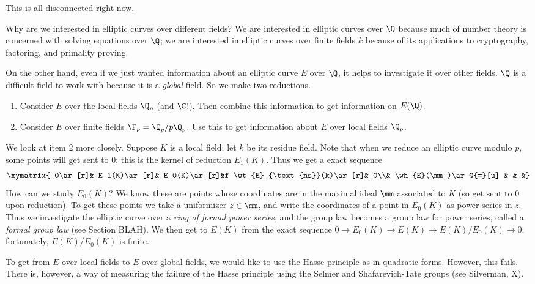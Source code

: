 This is all disconnected right now.

Why are we interested in elliptic curves over different fields? 
We are interested in elliptic curves over $\Q$ because much of number theory is concerned with solving equations over $\Q$; we are interested in elliptic curves over finite fields $k$ because of its applications to cryptography, factoring, and primality proving.

On the other hand, even if we just wanted information about an elliptic curve $E$ over $\Q$, it helps to investigate it over other fields. $\Q$ is a difficult field to work with because it is a {\it global} field. So we make two reductions.
\begin{enumerate}
\item Consider $E$ over the local fields $\Q_p$ (and $\C$!). Then combine this information to get information on $E(\Q)$.
\item Consider $E$ over finite fields $\F_p=\Q_p/p\Q_p$. Use this to get information about $E$ over local fields $\Q_p$.
\end{enumerate}
We look at item 2 more closely. Suppose $K$ is a local field; let $k$ be its residue field. 
Note that when we reduce an elliptic curve modulo $p$, some points will get sent to 0; this is the kernel of reduction $E_1(K)$. Thus we get a exact sequence
\[
\xymatrix{
0\ar[r]& E_1(K)\ar[r]&  E_0(K)\ar[r]&f  \wt{E}_{\text{ns}}(k)\ar[r]&  0\\%
& \wh{E}(\mm)\ar@{=}[u] &  & &}
\]
How can we study $E_0(K)$? We know these are points whose coordinates are in the maximal ideal $\mm$ associated to $K$ (so get sent to 0 upon reduction). 
To get these points we take a uniformizer $z\in \mm$, and write the coordinates of a point in $E_0(K)$ as power series in $z$. Thus we investigate the elliptic curve over a {\it ring of formal power series}, and the group law becomes a group law for power series, called a {\it formal group law} (see Section BLAH). We then get to $E(K)$ from the exact sequence $0\to E_0(K)\to E(K)\to E(K)/E_0(K)\to 0$; fortunately, $E(K)/E_0(K)$ is finite.

To get from $E$ over local fields to $E$ over global fields, we would like to use the Hasse principle as in quadratic forms. However, this fails. There is, however, a way of measuring the failure of the Hasse principle using the Selmer and Shafarevich-Tate groups (see Silverman, X).
